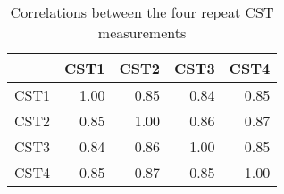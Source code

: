 \begin{table}[ht]
\centering
\label{tab:cstrpty}
\caption{Correlations between the four repeat CST measurements}
\vspace{0.1in}
\begin{tabular}{|r|rrrr|}
  \hline
 & CST1 & CST2 & CST3 & CST4 \\ 
  \hline
CST1 & 1.00 & 0.85 & 0.84 & 0.85 \\ 
  CST2 & 0.85 & 1.00 & 0.86 & 0.87 \\ 
  CST3 & 0.84 & 0.86 & 1.00 & 0.85 \\ 
  CST4 & 0.85 & 0.87 & 0.85 & 1.00 \\ 
   \hline
\end{tabular}
\end{table}

